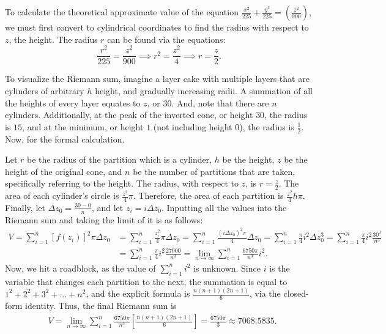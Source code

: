 \documentclass[12pt]{article}
\begin{document}
To calculate the theoretical approximate value of the equation $\frac{x^{2}}{225}
+ \frac{y^{2}}{225} = (\frac{z^{2}}{900})$, we must first convert to cylindrical
coordinates to find the radius with respect to $z$, the height. The radius $r$
can be found via the equations:
\begin{equation*}
    \frac{r^{2}}{225} = \frac{z^{2}}{900} \implies r^{2} = \frac{z^{2}}{4} \implies r = \frac{z}{2}.
\end{equation*}

To visualize the Riemann sum, imagine a layer cake with multiple layers 
that are cylinders of arbitrary $h$ height, and gradually increasing radii.
A  summation of all the heights of every layer equates to $z$, or $30$. 
And, note that there are $n$ cylinders. Additionally, at the peak of the
inverted cone, or height $30$, the radius is $15$, and at the minimum,
or height $1$ (not including height $0$), the radius is $\frac{1}{2}$. Now,
for the formal calculation.

Let $r$ be the radius of the partition which is a cylinder, $h$ be the 
height, $z$ be the height of the original cone, and $n$ be the number of 
partitions that are taken, specifically referring to the height. The 
radius, with respect to $z$, is $r = \frac{z}{2}$. The area of each 
cylinder's circle is $\frac{z^{2}}{4}\pi$. Therefore, the area of each 
partition is $\frac{z^{2}}{4}h\pi$. Finally, let $\Delta z_{0} = \frac{30 - 0}{n}$,
and let $z_{i} = i \Delta z_{0}$. Inputting all the values into the Riemann sum and
taking the limit of it is as follows:
\begin{align*}
    V = \sum_{i=1}^{n} [f(z_{i})]^{2} \pi \Delta z_{0} 
    &= \sum_{i=1}^{n} \frac{z_{i}^{2}}{4}\pi \Delta z_{0} 
    = \sum_{i=1}^{n} \frac{(i \Delta z_{0})^{2}\pi}{4} \Delta z_{0} 
    = \sum_{i=1}^{n} \frac{\pi}{4} i^{2} \Delta z_{0}^{3} 
    = \sum_{i=1}^{n} \frac{\pi}{4} i^{2} \frac{30^{3}}{n^{3}} \\
    &= \sum_{i=1}^{n} \frac{\pi}{4} i^{2} \frac{27000}{n^{3}}
    = \lim_{n \to \infty} \sum_{i=1}^{n} \frac{6750\pi}{n^{3}} i^{2}.
\end{align*}
Now, we hit a roadblock, as the value of $\sum_{i=1}^{n} i^{2}$ is unknown. Since $i$
is the variable that changes each partition to the next, the summation is
equal to $1^{2} + 2^{2} + 3^{2} + \dots + n^{2}$, and the explicit formula is $\frac{n(n
+ 1)(2n + 1)}{6}$, via the closed-form identity. Thus, the final Riemann
sum is
\begin{align*}
    &V = \lim_{n \to \infty} \sum_{i=1}^{n} \frac{6750\pi}{n^{3}} \left[ \frac{n(n + 1)(2n + 1)}
    {6} \right] = \frac{6750\pi}{3} \approx 7068.5835.
\end{align*}
\end{document}
